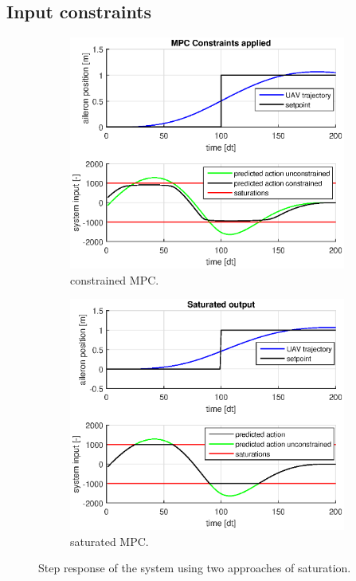 \documentclass[a4paper,11pt,titlepage]{article}
\begin{document}
\subsection{Input constraints}
\label{sec:input_constraints}
\begin{figure}[h]
\centering
\begin{subfigure}[b]{0.5\textwidth}
	\includegraphics[width=\textwidth]{fig/step_constrained_2.eps}
	\caption{constrained MPC.}
	\label{fig:mpc_constrained}
\end{subfigure}%
\begin{subfigure}[b]{0.5\textwidth}
	\includegraphics[width=\textwidth]{fig/step_saturated_2.eps}
	\caption{saturated MPC.}
	\label{fig:mpc_saturated}
\end{subfigure}
\caption{Step response of the system using two approaches of saturation.}
\end{figure}
\end{document}
